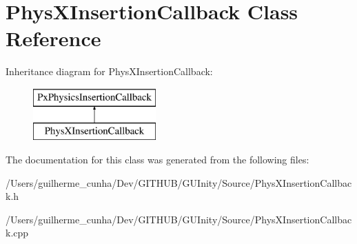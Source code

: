 \hypertarget{class_phys_x_insertion_callback}{}\section{Phys\+X\+Insertion\+Callback Class Reference}
\label{class_phys_x_insertion_callback}
Inheritance diagram for Phys\+X\+Insertion\+Callback\+:\begin{figure}[H]
\begin{center}
\leavevmode
\includegraphics[height=2.000000cm]{class_phys_x_insertion_callback}
\end{center}
\end{figure}


The documentation for this class was generated from the following files\+:\begin{DoxyCompactItemize}
\item 
/\+Users/guilherme\+\_\+cunha/\+Dev/\+G\+I\+T\+H\+U\+B/\+G\+U\+Inity/\+Source/Phys\+X\+Insertion\+Callback.\+h\item 
/\+Users/guilherme\+\_\+cunha/\+Dev/\+G\+I\+T\+H\+U\+B/\+G\+U\+Inity/\+Source/Phys\+X\+Insertion\+Callback.\+cpp\end{DoxyCompactItemize}
